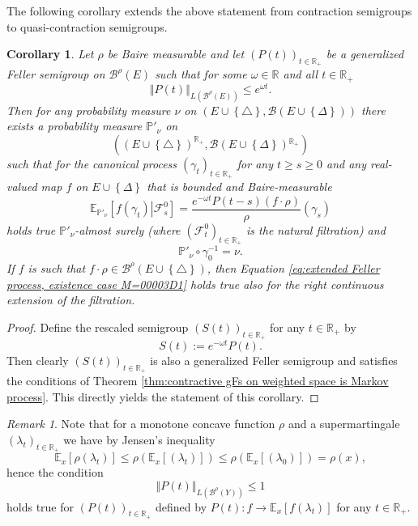 \documentclass[a4paper,12pt]{article}
\newtheorem{corollary}[theorem]{Corollary}
\theoremstyle{definition}
\theoremstyle{remark}
\newtheorem{remark}[theorem]{Remark}
\numberwithin{equation}{section}
\numberwithin{theorem}{section}
\begin{document}
The following corollary extends the above statement from contraction semigroups to quasi-contraction semigroups.

\begin{corollary}
\label{cor:M smaller 1 gFs on weighted space is Markov process} Let
$\rho$ be Baire measurable\textcolor{red}{{} }and let $\left(P(t)\right)_{t\in\mathbb{R}_{+}}$
be a generalized Feller semigroup on $\mathcal{\mathscr{B}}^{\rho}(E)$
such that for some $\omega\in\mathbb{R}$ and all $t\in\mathbb{R}_{+}$
\[
\left\Vert P(t)\right\Vert _{L(\mathcal{\mathscr{B}}^{\rho}(E))}\leq e^{\omega t}.
\]
 Then for any probability measure $\nu$ on $\left(E\cup\left\{ \triangle\right\} ,\mathcal{B}(E\cup\left\{ \Delta\right\} )\right)$
there exists a probability measure $\mathbb{P}'_{\nu}$ on 
\[
\left(\left(E\cup\left\{ \triangle\right\} \right)^{\mathbb{R}_{+}},\mathcal{B}(E\cup\left\{ \Delta\right\} ){}^{\mathbb{R}_{+}}\right)
\]
 such that for the canonical process $\left(\gamma_{t}\right)_{t\in\mathbb{R}_{+}}$\textcolor{red}{{}
}for any $t\geq s\geq0$ and any real-valued map $f$ on $E\cup\left\{ \Delta\right\} $
that is bounded and Baire-measurable
\begin{equation}
\mathbb{E}_{\mathbb{P}'_{\nu}}\left[\left.f(\gamma_{t})\right|\mathcal{F}_{s}^{0}\right]=\frac{e^{-\omega t}P\left(t-s\right)\left(f\cdot\rho\right)}{\rho}(\gamma_{s})\label{eq:extended Feller process, existence case M=00003D1}
\end{equation}
holds true $\mathbb{P}'_{\nu}$-almost surely (where $\left(\mathcal{F}_{t}^{0}\right)_{t\in\mathbb{R}_{+}}$
is the natural filtration) and 
\[
\mathbb{P}'_{\nu}\circ\gamma_{\text{0}}^{-1}=\nu.
\]
If $f$ is such that $f\cdot\rho\in\mathcal{\mathscr{B}}^{\rho}(E\cup\left\{ \triangle\right\} )$, then Equation \eqref{eq:extended Feller process, existence case M=00003D1}
holds true also for the right continuous extension of the filtration.
\end{corollary}

\begin{proof}
Define the rescaled semigroup $\left(S(t)\right)_{t\in\mathbb{R}_{+}}$ for any $t\in\mathbb{R}_{+}$
by 
\[
S(t):=e^{-\omega t}P(t).
\]
 Then clearly $\left(S(t)\right)_{t\in\mathbb{R}_{+}}$ is also a
generalized Feller semigroup and satisfies the conditions of Theorem
\ref{thm:contractive gFs on weighted space is Markov process}. This
directly yields the statement of this corollary. 
\end{proof}

\begin{remark}
Note that for
a monotone concave function $\rho$
and a supermartingale $\left(\lambda_{t}\right)_{t\in\mathbb{R}_{+}}$
we have by Jensen's inequality
\[
\mathbb{E}_{x}\left[\rho\left(\lambda_{t}\right)\right]\leq\rho\left(\mathbb{E}_{x}\left[\left(\lambda_{t}\right)\right]\right)\leq\rho\left(\mathbb{E}_{x}\left[\left(\lambda_{0}\right)\right]\right)=\rho(x),
\]
hence the condition 
\[
\left\Vert P(t)\right\Vert _{L(\mathcal{B}^{\rho}(Y))}\leq1
\]
 holds true for $\left(P(t)\right)_{t\in\mathbb{R}_{+}}$ defined
by $P(t):f\rightarrow\mathbb{E}_{x}\left[f\left(\lambda_{t}\right)\right]$
for any $t\in\mathbb{R}_{+}$.
\end{remark}
\end{document}
